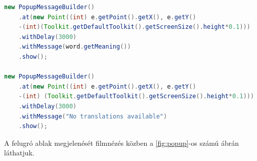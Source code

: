\begin{lstlisting}[caption=A \textit{PopupMessageBuilder} használata, label={lst:popup}, language=java]
new PopupMessageBuilder()
    .at(new Point((int) e.getPoint().getX(), e.getY()
    -(int)(Toolkit.getDefaultToolkit().getScreenSize().height*0.1)))
    .withDelay(3000)
    .withMessage(word.getMeaning())
    .show();

new PopupMessageBuilder()
    .at(new Point((int) e.getPoint().getX(), e.getY()
    -(int) (Toolkit.getDefaultToolkit().getScreenSize().height*0.1)))
    .withDelay(3000)
    .withMessage("No translations available")
    .show();
\end{lstlisting}

A felugró ablak megjelenését filmnézés közben a \ref{fig:popup}-os számú ábrán láthatjuk.